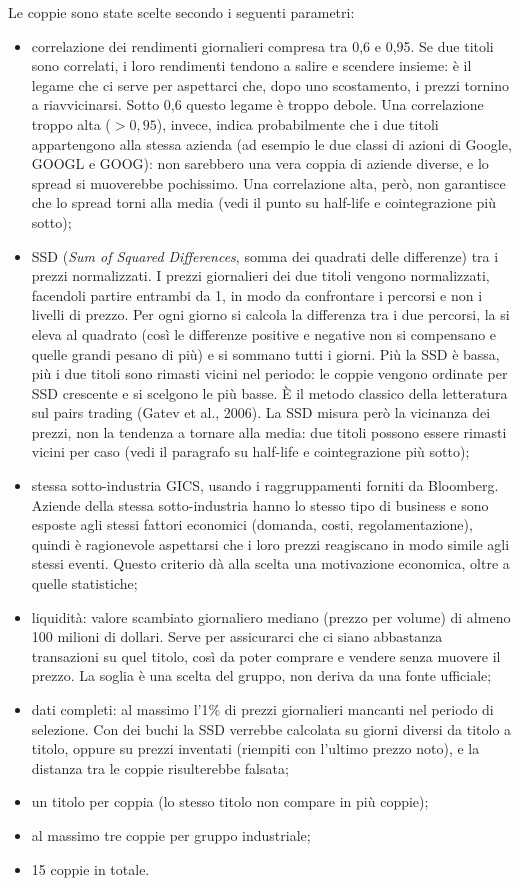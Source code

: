 \documentclass[11pt,a4paper]{article}
\begin{document}
Le coppie sono state scelte secondo i seguenti parametri:
\begin{itemize}
  \item correlazione dei rendimenti giornalieri compresa tra 0,6 e 0,95. Se due titoli sono correlati, i loro rendimenti tendono a salire e scendere insieme: è il legame che ci serve per aspettarci che, dopo uno scostamento, i prezzi tornino a riavvicinarsi. Sotto 0,6 questo legame è troppo debole. Una correlazione troppo alta ($>0{,}95$), invece, indica probabilmente che i due titoli appartengono alla stessa azienda (ad esempio le due classi di azioni di Google, GOOGL e GOOG): non sarebbero una vera coppia di aziende diverse, e lo spread si muoverebbe pochissimo. Una correlazione alta, però, non garantisce che lo spread torni alla media (vedi il punto su half-life e cointegrazione più sotto);
  \item SSD (\emph{Sum of Squared Differences}, somma dei quadrati delle differenze) tra i prezzi normalizzati. I prezzi giornalieri dei due titoli vengono normalizzati, facendoli partire entrambi da 1, in modo da confrontare i percorsi e non i livelli di prezzo. Per ogni giorno si calcola la differenza tra i due percorsi, la si eleva al quadrato (così le differenze positive e negative non si compensano e quelle grandi pesano di più) e si sommano tutti i giorni. Più la SSD è bassa, più i due titoli sono rimasti vicini nel periodo: le coppie vengono ordinate per SSD crescente e si scelgono le più basse. È il metodo classico della letteratura sul pairs trading (Gatev et al., 2006). La SSD misura però la vicinanza dei prezzi, non la tendenza a tornare alla media: due titoli possono essere rimasti vicini per caso (vedi il paragrafo su half-life e cointegrazione più sotto);
  \item stessa sotto-industria GICS, usando i raggruppamenti forniti da Bloomberg. Aziende della stessa sotto-industria hanno lo stesso tipo di business e sono esposte agli stessi fattori economici (domanda, costi, regolamentazione), quindi è ragionevole aspettarsi che i loro prezzi reagiscano in modo simile agli stessi eventi. Questo criterio dà alla scelta una motivazione economica, oltre a quelle statistiche;
  \item liquidità: valore scambiato giornaliero mediano (prezzo per volume) di almeno 100 milioni di dollari. Serve per assicurarci che ci siano abbastanza transazioni su quel titolo, così da poter comprare e vendere senza muovere il prezzo. La soglia è una scelta del gruppo, non deriva da una fonte ufficiale;
  \item dati completi: al massimo l'1\% di prezzi giornalieri mancanti nel periodo di selezione. Con dei buchi la SSD verrebbe calcolata su giorni diversi da titolo a titolo, oppure su prezzi inventati (riempiti con l'ultimo prezzo noto), e la distanza tra le coppie risulterebbe falsata;
  \item un titolo per coppia (lo stesso titolo non compare in più coppie);
  \item al massimo tre coppie per gruppo industriale;
  \item 15 coppie in totale.
\end{itemize}
\end{document}
